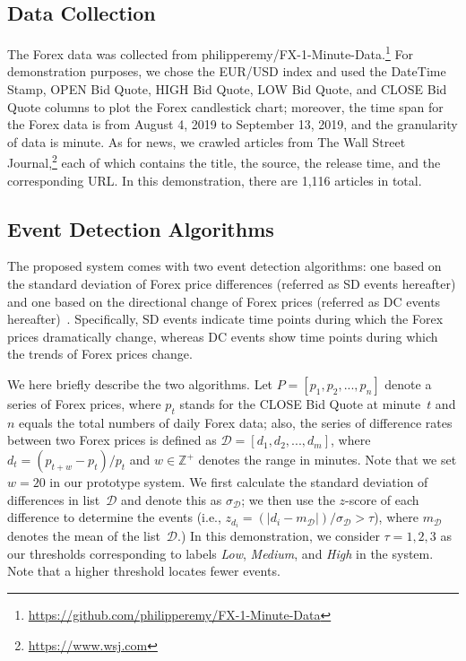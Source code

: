\documentclass[sigconf]{acmart}
\begin{document}
\subsection{Data Collection}
The Forex data was collected from
philipperemy/FX-1-Minute-Data.\footnote{\url{https://github.com/philipperemy/FX-1-Minute-Data}}
For demonstration purposes, we chose the EUR/USD index and used the DateTime
Stamp, OPEN Bid Quote, HIGH Bid Quote, LOW Bid Quote, and CLOSE Bid Quote
columns to plot the Forex candlestick chart; moreover, the time span for the
Forex data is from August 4, 2019 to September 13, 2019, and the granularity of
data is minute. 
As for news, we crawled articles from The Wall Street
Journal,\footnote{\url{https://www.wsj.com}} each of which contains the title,
the source, the release time, and the corresponding URL.
In this demonstration, there are 1,116 articles in total.

\subsection{Event Detection Algorithms}\label{sec:algo}
The proposed system comes with two event detection algorithms: one based on
the standard deviation of Forex price differences (referred as SD events
hereafter) and one based on the directional change of Forex prices (referred
as DC events hereafter)~\cite{7850020}. 
Specifically, SD events indicate time points during which the Forex prices
dramatically change, whereas DC events show time points during which the trends of
Forex prices change.

We here briefly describe the two algorithms.
Let $P= [p_1, p_2, ..., p_n]$ denote a series of Forex prices, where $p_t$
stands for the CLOSE Bid Quote at minute~$t$ and $n$ equals the total
numbers of daily Forex data; also, the series of difference rates between two
Forex prices is defined as $\mathcal{D}= [d_1, d_2, ..., d_m]$, where $d_t =
{(p_{t+w}-p_t)}/{p_t}$ and $w\in\mathbb Z^+$ denotes the range in minutes.
Note that we set $w=20$ in our prototype system.
We first calculate the standard deviation of differences in list~$\mathcal{D}$
and denote this as $\sigma_\mathcal{D}$; we then use the $z$-score of each
difference to determine the events (i.e.,
$z_{d_i}=(|d_i-m_{\mathcal{D}}|)/\sigma_{\mathcal{D}}>\tau$), where
$m_{\mathcal{D}}$ denotes the mean of the list~$\mathcal{D}$.)
In this demonstration, we consider $\tau=1,2,3$ as our thresholds 
corresponding to labels \emph{Low}, \emph{Medium}, and \emph{High} in the
system. 
Note that a higher threshold locates fewer events.
\end{document}

